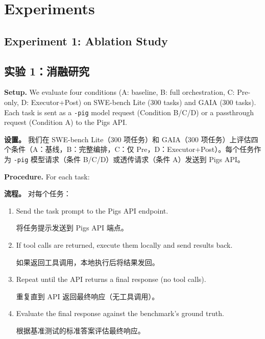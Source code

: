 \section{Experiments}
\label{sec:experiments}

\subsection{Experiment 1: Ablation Study}
\begin{chinese}
\subsection*{实验 1：消融研究}
\end{chinese}

\textbf{Setup.} We evaluate four conditions (A: baseline, B: full orchestration, C: Pre-only, D: Executor+Post) on SWE-bench Lite (300 tasks) and GAIA (300 tasks). Each task is sent as a \texttt{-pig} model request (Condition B/C/D) or a passthrough request (Condition A) to the Pigs API.
\begin{chinese}
\textbf{设置。} 我们在 SWE-bench Lite（300 项任务）和 GAIA（300 项任务）上评估四个条件（A：基线，B：完整编排，C：仅 Pre，D：Executor+Post）。每个任务作为 \texttt{-pig} 模型请求（条件 B/C/D）或透传请求（条件 A）发送到 Pigs API。
\end{chinese}

\textbf{Procedure.} For each task:
\begin{chinese}
\textbf{流程。} 对每个任务：
\end{chinese}
\begin{enumerate}[nosep]
    \item Send the task prompt to the Pigs API endpoint.
    \begin{chinese}
    将任务提示发送到 Pigs API 端点。
    \end{chinese}
    \item If tool calls are returned, execute them locally and send results back.
    \begin{chinese}
    如果返回工具调用，本地执行后将结果发回。
    \end{chinese}
    \item Repeat until the API returns a final response (no tool calls).
    \begin{chinese}
    重复直到 API 返回最终响应（无工具调用）。
    \end{chinese}
    \item Evaluate the final response against the benchmark's ground truth.
    \begin{chinese}
    根据基准测试的标准答案评估最终响应。
    \end{chinese}
\end{enumerate}

